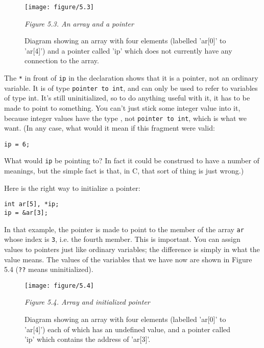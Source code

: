    \begin{figure*}[htb]\centering
     \texttt{[image: figure/5.3]}
     \caption{Diagram showing an array with four elements
       (labelled 'ar[0]' to 'ar[4]') and a pointer called 'ip'
       which does not currently have any connection to the array.}
   \begin{center}\textit{Figure 5.3. An array and a pointer}\end{center}
   \end{figure*}



   The \texttt{*} in front of \texttt{ip} in the declaration
    shows that it is a pointer, not an ordinary variable. It is of type
    \texttt{pointer to int}, and can only be used to refer to variables
    of type int. It's still uninitialized, so to do anything useful with it,
    it has to be made to point to something. You can't just stick some
    integer value into it, because integer values have the type
    \kint, not \texttt{pointer to int}, which is what we
    want.  (In any case, what would it mean if this fragment were valid:


   \begin{Verbatim}
ip = 6;
\end{Verbatim}

   What would \texttt{ip} be pointing to? In fact it could be
    construed to have a number of meanings, but the simple fact is that, in
    C, that sort of thing is just wrong.)


   Here is the right way to initialize a pointer:


   \begin{Verbatim}
int ar[5], *ip;
ip = &ar[3];
\end{Verbatim}

   In that example, the pointer is made to point to the member of the
    array \texttt{ar} whose index is \texttt{3}, i.e. the fourth
    member. This is important. You can assign values to pointers just like
    ordinary variables; the difference is simply in what the value means.
    The values of the variables that we have now are shown in Figure 5.4 (\texttt{??} means uninitialized).


    \begin{figure*}\centering
      \texttt{[image: figure/5.4]}
      \caption{Diagram showing an array with four elements
        (labelled 'ar[0]' to 'ar[4]') each of which has an undefined value,
        and a pointer called 'ip' which contains the address of 'ar[3]'.}
    \begin{center}\textit{Figure 5.4. Array and initialized pointer}\end{center}
    \end{figure*}



